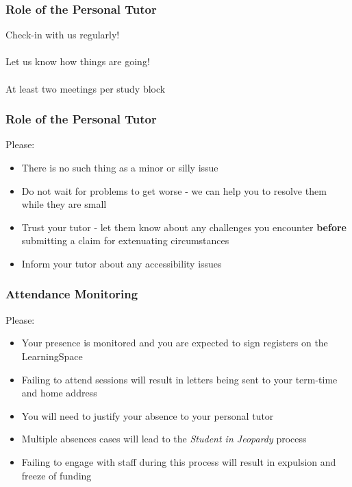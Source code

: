 \begin{frame}
	\frametitle{Role of the Personal Tutor}	
	
	\begin{center}
		Check-in with us regularly!
		\\~\\
		Let us know how things are going!
		\\~\\
		At least two meetings per study block
	\end{center}
\end{frame}

\begin{frame}
	\frametitle{Role of the Personal Tutor}	
	
	Please:
	
	\begin{itemize}
		\item There is no such thing as a minor or silly issue
		\item Do not wait for problems to get worse - we can help you to resolve them while they are small
		\item Trust your tutor - let them know about any challenges you encounter
		         \textbf{before} submitting a claim for extenuating circumstances
		\item Inform your tutor about any accessibility issues
	\end{itemize}
\end{frame}

\begin{frame}
	\frametitle{Attendance Monitoring}	
	
	Please:
	
	\begin{itemize}
		\item Your presence is monitored and you are expected to sign registers on the LearningSpace
		\item Failing to attend sessions will result in letters being sent to your term-time and home address
		\item You will need to justify your absence to your personal tutor
		\item Multiple absences cases will lead to the \textit{Student in Jeopardy} process
		\item Failing to engage with staff during this process will result in expulsion and freeze of funding
	\end{itemize}
\end{frame}

